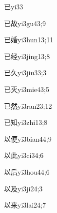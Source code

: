 \begin{verbete}{已}{yi3}{3}
\end{verbete}

\begin{verbete}{已故}{yi3gu4}{3;9}
\end{verbete}

\begin{verbete}{已婚}{yi3hun1}{3;11}
\end{verbete}

\begin{verbete}{已经}{yi3jing1}{3;8}
\end{verbete}

\begin{verbete}{已久}{yi3jiu3}{3;3}
\end{verbete}

\begin{verbete}{已灭}{yi3mie4}{3;5}
\end{verbete}

\begin{verbete}{已然}{yi3ran2}{3;12}
\end{verbete}

\begin{verbete}{已知}{yi3zhi1}{3;8}
\end{verbete}

\begin{verbete}{以便}{yi3bian4}{4;9}
\end{verbete}

\begin{verbete}{以此}{yi3ci3}{4;6}
\end{verbete}

\begin{verbete}{以后}{yi3hou4}{4;6}
\end{verbete}

\begin{verbete}{以及}{yi3ji2}{4;3}
\end{verbete}

\begin{verbete}{以来}{yi3lai2}{4;7}
\end{verbete}

